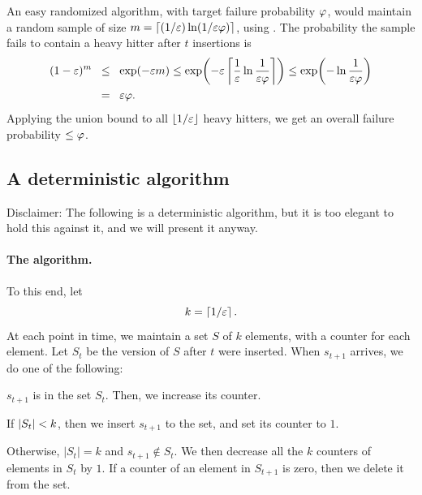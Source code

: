An easy randomized algorithm, with target failure probability $\varphi$,
would maintain a random sample of size
$m = \left\lceil {(1/{\varepsilon}) \ln( 1/{\varepsilon}\varphi)} \right\rceil$, using . The probability the sample fails to
contain a heavy hitter after $t$ insertions is
\begin{align*}
    (1-\eps)^m
    &\LEQ
    \exp(-\eps m )%
    \leq%
    \exp\pth{-\eps \ceil{\frac{1}{\eps} \ln \frac{1}{\eps \BadProb}} }%
    \leq 
    \exp\pth{- \ln \frac{1}{\eps \BadProb}}%
    \\&
    \EQ 
    {\eps \BadProb}.
\end{align*}
Applying the union bound to all $\left\lfloor {1/{\varepsilon}} \right\rfloor$ heavy hitters, we get an
overall failure probability $\leq \varphi$.



\subsection{A deterministic algorithm}
Disclaimer: The following is a deterministic algorithm, but it is too
elegant to hold this against it, and we will present it anyway.


\paragraph*{The algorithm.}
To this end, let
\begin{equation*}
    k = \left\lceil {1/{\varepsilon}} \right\rceil. 
\end{equation*}
At each point in time, we maintain a set $S$ of $k$ elements, with a
counter for each element. Let $S_t$ be the version of $S$ after $t$ were
inserted. When $s_{t+1}$ arrives, we do one of the following:
\begin{compactenumA}
    \smallskip%
    \item $s_{t+1}$ is in the set $S_t$. Then, we increase its counter.

    \smallskip%
    \item If $\left| {S_t} \right| < k$, then we insert $s_{t+1}$ to the set, and
    set its counter to $1$.

    \smallskip%
    \item Otherwise, $|S_t|=k$ and $s_{t+1} \notin S_t$. We then decrease
    all the $k$ counters of elements in $S_t$ by $1$. If a counter of an
    element in $S_{t+1}$ is zero, then we delete it from the set.
\end{compactenumA}
    


